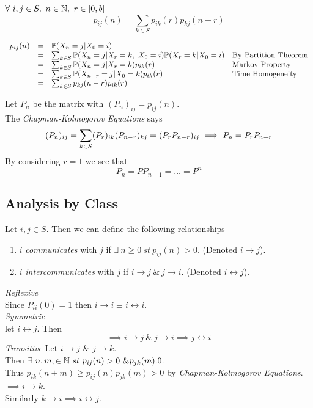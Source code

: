 \documentclass[11pt,a4paper]{article}
\begin{document}
$\forall\ i,j\in S,\ n\in\nats,\ r\in[0,b]$
$$p_{ij}(n)=\sum_{k\in S}p_{ik}(r)p_{kj}(n-r)$$

\[\begin{array}{rcll}
p_{ij}(n)&=&\prob(X_n=j|X_0=i)\\
&=&\sum_{k\in S}\prob(X_n=j|X_r=k,\ X_0=i)\prob(X_r=k|X_0=i)&\mathrm{By\ Partition\ Theorem}\\
&=&\sum_{k\in S}\prob(X_n=j|X_r=k)p_{ik}(r)&\mathrm{Markov\ Property}\\
&=&\sum_{k\in S}\prob(X_{n-r}=j|X_0=k)p_{ik}(r)&\mathrm{Time\ Homogeneity}\\
&=&\sum_{k\in S}p_{kj}(n-r)p_{ik}(r)
\end{array}\]

Let $P_n$ be the matrix with $(P_n)_{ij}=p_{ij}(n)$.\\
The \textit{Chapman-Kolmogorov Equations} says
$$(P_n)_{ij}=\sum_{k\in S}(P_r)_{ik}(P_{n-r})_{kj}=(P_rP_{n-r})_{ij}\\\implies P_n=P_rP_{n-r}$$
By considering $r=1$ we see that
$$P_n=PP_{n-1}=\dots=P^n$$

\subsection{Analysis by Class}

Let $i,j\in S$. Then we can define the following relationships
\begin{enumerate}[label=\roman*)]
	\item $i$ \textit{communicates} with $j$ if $\exists\ n\geq0\ st\ p_{ij}(n)>0$. (Denoted $i\to j$).
	\item $i$ \textit{intercommunicates} with $j$ if $i\to j\ \&\ j\to i$. (Denoted $i\leftrightarrow j$).
\end{enumerate}

\textit{Reflexive}\\
Since $P_{ii}(0)=1$ then $i\to i\equiv i\leftrightarrow i$.\\
\textit{Symmetric}\\
let $i\leftrightarrow j$. Then
$$\implies i\to j\ \&\ j\to i\implies j\leftrightarrow i$$
\textit{Transitive}
Let $i\to j$ \& $j\to k$.\\
Then $\exists\ n,m,\in\nats\ st\ p_{ij}(n)>0\ \& p_{jk}(m).0$.\\
Thus $p_{ik}(n+m)\geq p_{ij}(n)p_{jk}(m)>0$ by \textit{Chapman-Kolmogorov Equations}.\\
$\implies i\to k$.\\
Similarly $k\to i\implies i\leftrightarrow j$.\\
\end{document}
